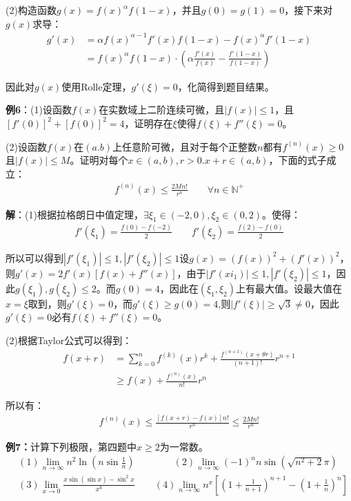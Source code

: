\documentclass{ctexart}
\let\oldtextbf\textbf %
\renewcommand{\textbf}[1]{\textcolor{btex}{\oldtextbf{#1}}} %
\begin{document}
(2)构造函数$g(x)=f(x)^\alpha f(1-x)$，并且$g(0)=g(1)=0$，接下来对$g(x)$求导：
\begin{align*}
g'(x)&=\alpha f(x)^{\alpha-1}f'(x)f(1-x)-f(x)^\alpha f'(1-x)\\
&=f(x)^\alpha f(1-x)\cdot\left(\alpha \frac{f'(x)}{f(x)}-\frac{f'(1-x)}{f(1-x)}\right)
\end{align*}

因此对$g(x)$使用Rolle定理，$g'(\xi)=0$，化简得到题目结果。

\textbf{例6}：(1)设函数$f(x)$在实数域上二阶连续可微，且$|f(x)|\leq 1$，且$[f'(0)]^2+[f(0)]^2=4$，证明存在$\xi$使得$f(\xi)+f''(\xi)=0$。

(2)设函数$f(x)$在$(a.b)$上任意阶可微，且对于每个正整数$n$都有$f^{(n)}(x)\geq 0$ 且$|f(x)|\leq M$。证明对每个$x\in(a,b),r>0.x+r\in(a,b)$，下面的式子成立：
\begin{align*}
    f^{(n)}(x)\leq \frac{2Mn!}{r^n}\qquad \forall n\in\mathbb{N^+}
\end{align*}

\textbf{解}：(1)根据拉格朗日中值定理，$\exists \xi_1\in(-2,0),\xi_2\in(0,2)$。使得：
\begin{align*}
    f'(\xi_1)=\frac{f(0)-f(-2)}{2}\qquad f'(\xi_2)=\frac{f(2)-f(0)}{2}
\end{align*}

所以可以得到$|f'(\xi_1)|\leq 1,|f'(\xi_2)|\leq 1$设$g(x)=(f(x))^2+(f'(x))^2$，则$g'(x)=2f'(x)[f(x)+f''(x)]$，由于$|f'(xi_1)|\leq 1,|f'(\xi_2)|\leq 1$，因此$g(\xi_1),g(\xi_2)\leq 2$。而$g(0)=4$，因此在$(\xi_1,\xi_2)$上有最大值。设最大值在$x=\xi$取到，则$g'(\xi)=0$，而$g'(\xi)\geq g(0)=4$,则$|f'(\xi)|\geq\sqrt{3}\neq 0$，因此$g'(\xi)=0$必有$f(\xi)+f''(\xi)=0$。

(2)根据Taylor公式可以得到：
\begin{align*}
    f(x+r)&=\sum_{k=0}^n f^{(k)}(x)r^k+\frac{f^{(n+1)}(x+\theta r)}{(n+1)!}r^{n+1}\\
    &\geq f(x)+\frac{f^{(n)}(x)}{n!}r^n
\end{align*}

所以有：
\begin{align*}
    f^{(n)}(x)\leq \frac{[f(x+r)-f(x)]n!}{r^n}\leq\frac{2Mn!}{r^n}
\end{align*}

\textbf{例7：}计算下列极限，第四题中$x\geq 2$为一常数。
\begin{align*}
&(1) \lim_{n\to\infty}n^2\ln(n\sin\frac{1}{n})\qquad \qquad(2)\lim_{n\to\infty}(-1)^n n\sin(\sqrt{n^2+2}\pi)\\
&(3)\lim_{x\to 0}\frac{x\sin(\sin x)-\sin^2x}{x^6}\qquad (4) \lim_{n\to\infty}n^x\left[(1+\frac{1}{n+1})^{n+1} -(1+\frac{1}{n})^n 
\right] 
\end{align*}
\end{document}
